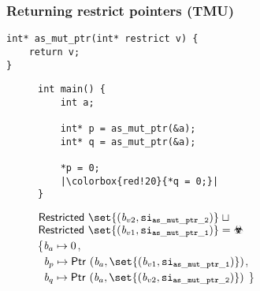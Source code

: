 \begin{frame}[fragile]
\frametitle{Returning restrict pointers (TMU)}

\begin{verbatim}
int* as_mut_ptr(int* restrict v) {
    return v;
}
\end{verbatim}

\vspace*{-1cm}

\begin{figure}[!h]
\begin{minipage}[t]{.4\textwidth}

\begin{verbatim}
int main() {
    int a;

    int* p = as_mut_ptr(&a);
    int* q = as_mut_ptr(&a);

    *p = 0;
    |\colorbox{red!20}{*q = 0;}|
}

\end{verbatim}
\end{minipage}%
\begin{minipage}{.6\textwidth}
\colorbox{red!20}{$\restricted{\set{(\Blockvar_{v2}, \scope{as\_mut\_ptr\_2})}} \joinsym$} \\
\colorbox{red!20}{$\restricted{\set{(\Blockvar_{v1}, \scope{as\_mut\_ptr\_1})}} = \rsub$} \\

\executionannotation
{
    \{$\textit{b}_a \mapsto 0$, \\
        \ $\Blockvar_p \mapsto \ptr{(\Blockvar_a, \set{(\Blockvar_{v1}, \scope{as\_mut\_ptr\_1})})}$, \\
        \ $\Blockvar_q \mapsto \ptr{(\Blockvar_a, \set{(\Blockvar_{v2}, \scope{as\_mut\_ptr\_2})})}$
    \}
    }
{
}
\end{minipage}
\end{figure}

\end{frame}



